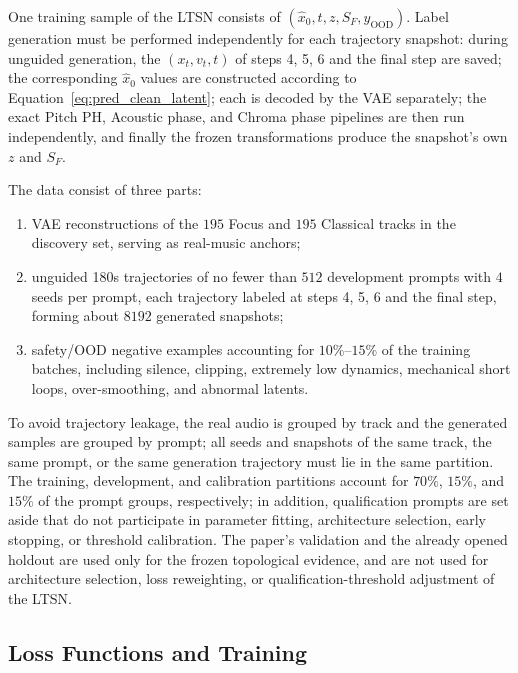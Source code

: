 \documentclass{article}
\begin{document}
One training sample of the LTSN consists of $(\hat{x}_0,t,z,S_F,y_{\mathrm{OOD}})$. Label generation must be performed independently for each trajectory snapshot: during unguided generation, the $(x_t,v_t,t)$ of steps 4, 5, 6 and the final step are saved; the corresponding $\hat{x}_0$ values are constructed according to Equation~\eqref{eq:pred_clean_latent}; each is decoded by the VAE separately; the exact Pitch PH, Acoustic phase, and Chroma phase pipelines are then run independently, and finally the frozen transformations produce the snapshot's own $z$ and $S_F$.

The data consist of three parts:
\begin{enumerate}
    \item VAE reconstructions of the $195$ Focus and $195$ Classical tracks in the discovery set, serving as real-music anchors;
    \item unguided 180s trajectories of no fewer than $512$ development prompts with $4$ seeds per prompt, each trajectory labeled at steps 4, 5, 6 and the final step, forming about $8192$ generated snapshots;
    \item safety/OOD negative examples accounting for $10\%$--$15\%$ of the training batches, including silence, clipping, extremely low dynamics, mechanical short loops, over-smoothing, and abnormal latents.
\end{enumerate}

To avoid trajectory leakage, the real audio is grouped by track and the generated samples are grouped by prompt; all seeds and snapshots of the same track, the same prompt, or the same generation trajectory must lie in the same partition. The training, development, and calibration partitions account for $70\%$, $15\%$, and $15\%$ of the prompt groups, respectively; in addition, qualification prompts are set aside that do not participate in parameter fitting, architecture selection, early stopping, or threshold calibration. The paper's validation and the already opened holdout are used only for the frozen topological evidence, and are not used for architecture selection, loss reweighting, or qualification-threshold adjustment of the LTSN.

\subsection{Loss Functions and Training}
\end{document}
